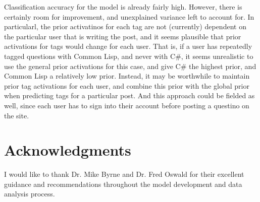 \documentclass[10pt,letterpaper]{article}
\begin{document}
Classification accuracy for the model is already fairly high.
However, there is certainly room for improvement, and unexplained variance left to account for.
In particularl, the prior activatinos for each tag are not (currently) dependent on the particular user that is writing the post, and it seems plausible that prior activations for tags would change for each user.
That is, if a user has repeatedly tagged questions with Common Lisp, and never with C\#, it seems unrealistic to use the general prior activations for this case, and give C\# the highest prior, and Common Lisp a relatively low prior.
Instead, it may be worthwhile to maintain prior tag activations for each user, and combine this prior with the global prior when predicting tags for a particular post.
And this approach could be fielded as well, since each user has to sign into their account before posting a questino on the site.

\section{Acknowledgments}

I would like to thank Dr. Mike Byrne and Dr. Fred Oswald for their excellent guidance and recommendations throughout the model development and data analysis process.


\setlength{\bibleftmargin}{.125in}
\setlength{\bibindent}{-\bibleftmargin}

\end{document}
